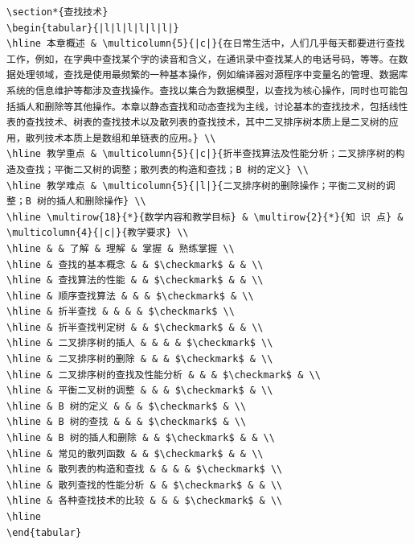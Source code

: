 \documentclass[10pt]{article}
\begin{document}
\begin{verbatim}
\section*{查找技术}
\begin{tabular}{|l|l|l|l|l|l|}
\hline 本章概述 & \multicolumn{5}{|c|}{在日常生活中，人们几乎每天都要进行查找工作，例如，在字典中查找某个字的读音和含义，在通讯录中查找某人的电话号码，等等。在数据处理领域，查找是使用最频繁的一种基本操作，例如编译器对源程序中变量名的管理、数据库系统的信息维护等都涉及查找操作。查找以集合为数据模型，以查找为核心操作，同时也可能包括插人和删除等其他操作。本章以静态査找和动态查找为主线，讨论基本的查找技术，包括线性表的查找技术、树表的查找技术以及散列表的查找技术，其中二叉排序树本质上是二叉树的应用，散列技术本质上是数组和单链表的应用。} \\
\hline 教学重点 & \multicolumn{5}{|c|}{折半查找算法及性能分析；二叉排序树的构造及查找；平衡二又树的调整；散列表的构造和查找；B 树的定义} \\
\hline 教学难点 & \multicolumn{5}{|l|}{二叉排序树的删除操作；平衡二叉树的调整；B 树的插人和删除操作} \\
\hline \multirow{18}{*}{数学内容和教学目标} & \multirow{2}{*}{知 识 点} & \multicolumn{4}{|c|}{教学要求} \\
\hline & & 了解 & 理解 & 掌握 & 熟练掌握 \\
\hline & 查找的基本概念 & & $\checkmark$ & & \\
\hline & 查找算法的性能 & & $\checkmark$ & & \\
\hline & 顺序查找算法 & & & $\checkmark$ & \\
\hline & 折半查找 & & & & $\checkmark$ \\
\hline & 折半查找判定树 & & $\checkmark$ & & \\
\hline & 二叉排序树的插人 & & & & $\checkmark$ \\
\hline & 二叉排序树的删除 & & & $\checkmark$ & \\
\hline & 二叉排序树的查找及性能分析 & & & $\checkmark$ & \\
\hline & 平衡二叉树的调整 & & & $\checkmark$ & \\
\hline & B 树的定义 & & & $\checkmark$ & \\
\hline & B 树的查找 & & & $\checkmark$ & \\
\hline & B 树的插人和删除 & & $\checkmark$ & & \\
\hline & 常见的散列函数 & & $\checkmark$ & & \\
\hline & 散列表的构造和查找 & & & & $\checkmark$ \\
\hline & 散列查找的性能分析 & & $\checkmark$ & & \\
\hline & 各种查找技术的比较 & & & $\checkmark$ & \\
\hline
\end{tabular}


\end{verbatim}
\end{document}
